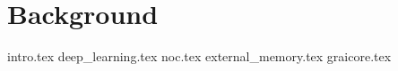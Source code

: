 \chapter{Background}
\label{ch:2}
{intro.tex}
{deep_learning.tex}
{noc.tex}
{external_memory.tex}
{graicore.tex}



